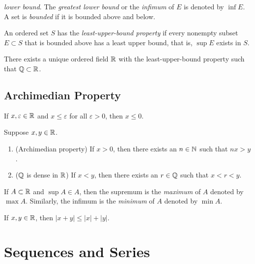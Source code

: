 \documentclass[12pt]{article}
\begin{document}
\textit{lower bound}.
The \textit{greatest lower bound} or the \textit{infimum} of \(E\) is denoted
by \(\inf E\).
A set is \textit{bounded} if it is bounded above and below.
\begin{definition}
    An ordered set \(S\) has the \textit{least-upper-bound property} if every
    nonempty subset \(E\subset S\) that is bounded above has a least upper
    bound, that is, \(\sup E\) exists in \(S\).
\end{definition}
\begin{theorem}
    There exists a unique ordered field \(\mathbb{R}\) with the least-upper-bound
    property such that \(\mathbb{Q}\subset\mathbb{R}\).
\end{theorem}

\subsection{Archimedian Property}
\begin{theorem}
    If \(x,\varepsilon\in\mathbb{R}\) and \(x\leq\varepsilon\) for all
    \(\varepsilon>0\), then \(x\leq0\).
\end{theorem}
\begin{theorem}
    Suppose \(x,y\in\mathbb{R}\).
    \begin{enumerate}
        \item (Archimedian property) If \(x>0\), then there exists an
        \(n\in\mathbb{N}\) such that \(nx>y\).
        \item (\(\mathbb{Q}\) is dense in \(\mathbb{R}\)) If \(x<y\), then there exists an
        \(r\in\mathbb{Q}\) such that \(x<r<y\).
    \end{enumerate}
\end{theorem}
If \(A\subset\mathbb{R}\) and \(\sup A\in A\), then the supremum is the
\textit{maximum} of \(A\) denoted by \(\max A\).
Similarly, the infimum is the \textit{minimum} of \(A\) denoted by \(\min A\).
\begin{theorem}
    If \(x,y\in\mathbb{R}\), then \(|x+y|\leq|x|+|y|\).
\end{theorem}

\section{Sequences and Series}
\end{document}
